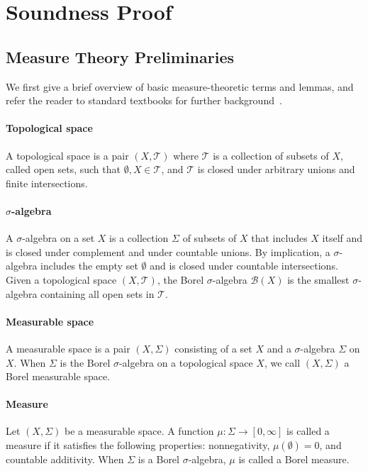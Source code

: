 \section{Soundness Proof}
\label{sec:app:soundness_new}

\subsection{Measure Theory Preliminaries}

We first give a brief overview of basic measure-theoretic terms and lemmas, and refer the reader to standard textbooks for further background~\cite{SteinShakarchi2005RealAnalysis,Tao2011MeasureTheory}.

\paragraph{Topological space} A topological space is a pair $(X, \mathcal{T})$ where $\mathcal{T}$ is a collection of subsets of $X$, called open sets, such that $\emptyset, X \in \mathcal{T}$, and $\mathcal{T}$ is closed under arbitrary unions and finite intersections.

\paragraph{$\sigma$-algebra} A $\sigma$-algebra on a set $X$ is a collection $\Sigma$ of subsets of $X$ that includes $X$ itself and is closed under complement and under countable unions. By implication, a $\sigma$-algebra includes the empty set $\emptyset$ and is closed under countable intersections. 
Given a topological space $(X, \mathcal{T})$, the Borel $\sigma$-algebra $\mathcal{B}(X)$ is the smallest $\sigma$-algebra containing all open sets in $\mathcal{T}$.

\paragraph{Measurable space} A measurable space is a pair $(X,\Sigma)$ consisting of a set $X$ and a $\sigma$-algebra $\Sigma$ on $X$.
When $\Sigma$ is the Borel $\sigma$-algebra on a topological space $X$, we call $(X, \Sigma)$ a Borel measurable space.

\paragraph{Measure} Let $(X,\Sigma)$ be a measurable space. A function $\mu : \Sigma \to [0,\infty]$ is called a measure if it satisfies the following properties: nonnegativity, $\mu(\emptyset) = 0$, and countable additivity.
When $\Sigma$ is a Borel $\sigma$-algebra, $\mu$ is called a Borel measure.

